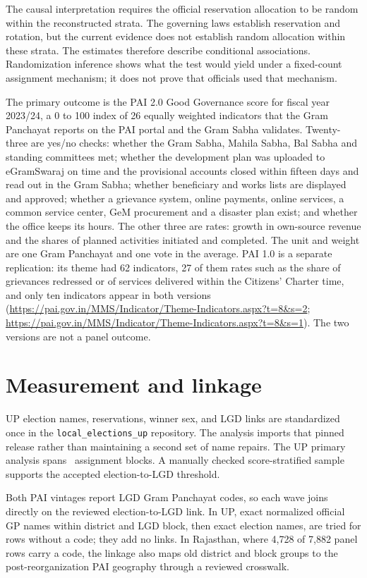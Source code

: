 \documentclass[12pt]{article}
\begin{document}
The causal interpretation requires the official reservation allocation to be random within the reconstructed strata. The governing laws establish reservation and rotation, but the current evidence does not establish random allocation within these strata. The estimates therefore describe conditional associations. Randomization inference shows what the test would yield under a fixed-count assignment mechanism; it does not prove that officials used that mechanism.

The primary outcome is the PAI 2.0 Good Governance score for fiscal year 2023/24, a 0 to 100 index of 26 equally weighted indicators that the Gram Panchayat reports on the PAI portal and the Gram Sabha validates. Twenty-three are yes/no checks: whether the Gram Sabha, Mahila Sabha, Bal Sabha and standing committees met; whether the development plan was uploaded to eGramSwaraj on time and the provisional accounts closed within fifteen days and read out in the Gram Sabha; whether beneficiary and works lists are displayed and approved; whether a grievance system, online payments, online services, a common service center, GeM procurement and a disaster plan exist; and whether the office keeps its hours. The other three are rates: growth in own-source revenue and the shares of planned activities initiated and completed. The unit and weight are one Gram Panchayat and one vote in the average. PAI 1.0 is a separate replication: its theme had 62 indicators, 27 of them rates such as the share of grievances redressed or of services delivered within the Citizens' Charter time, and only ten indicators appear in both versions (\url{https://pai.gov.in/MMS/Indicator/Theme-Indicators.aspx?t=8&s=2}; \url{https://pai.gov.in/MMS/Indicator/Theme-Indicators.aspx?t=8&s=1}). The two versions are not a panel outcome.

\section{Measurement and linkage}

UP election names, reservations, winner sex, and LGD links are standardized once in the \texttt{local\_elections\_up} repository. The analysis imports that pinned release rather than maintaining a second set of name repairs. The UP primary analysis spans \UpPaiTwoBlocks\ assignment blocks. A manually checked score-stratified sample supports the accepted election-to-LGD threshold.

Both PAI vintages report LGD Gram Panchayat codes, so each wave joins directly on the reviewed election-to-LGD link. In UP, exact normalized official GP names within district and LGD block, then exact election names, are tried for rows without a code; they add no links. In Rajasthan, where 4,728 of 7,882 panel rows carry a code, the linkage also maps old district and block groups to the post-reorganization PAI geography through a reviewed crosswalk.
\end{document}
